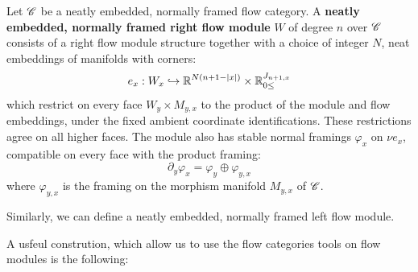 \begin{defn}\label{def:FramedFlowModule}
    Let $\mathscr{C}$ be a neatly embedded, normally framed flow category. A \textbf{neatly embedded, normally framed right flow module} $W$ of degree $n$ over $\mathscr{C}$ consists of a right flow module structure together with a choice of integer $N$, neat embeddings of manifolds with corners:
    \begin{equation*}
        e_x: W_x \hookrightarrow \mathbb{R}^{N(n+1-\left\lvert x\right\rvert)} \times \mathbb{R}_{0 \leq}^{J_{n+1,x}}
    \end{equation*}
    which restrict on every face $W_y\times M_{y,x}$ to the product of the module and flow embeddings, under the fixed ambient coordinate identifications. These restrictions agree on all higher faces. The module also has stable normal framings $\varphi_x$ on $\nu e_x$, compatible on every face with the product framing:
    \begin{equation*}
        \partial_y \varphi_x = \varphi_y \oplus \varphi_{y,x}
    \end{equation*}
    where $\varphi_{y,x}$ is the framing on the morphism manifold $M_{y,x}$ of $\mathscr{C}$.
\end{defn}

Similarly, we can define a neatly embedded, normally framed left flow module.

A usfeul constrution, which allow us to use the flow categories tools on flow modules is the following:

